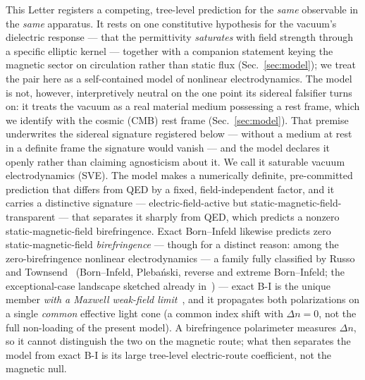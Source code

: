 \documentclass[aps,prd,twocolumn,superscriptaddress,nofootinbib,longbibliography]{revtex4-2}
\begin{document}
This Letter registers a competing, tree-level prediction for the \emph{same}
observable in the \emph{same} apparatus. It rests on one constitutive
hypothesis for the vacuum's dielectric response --- that the permittivity
\emph{saturates} with field strength through a specific elliptic kernel ---
together with a companion statement keying the magnetic sector on circulation
rather than static flux (Sec.~\ref{sec:model}); we treat the pair here as a
self-contained model of nonlinear electrodynamics. The model is not, however,
interpretively neutral on the one point its sidereal falsifier turns on: it
treats the vacuum as a real material medium possessing a rest frame, which we
identify with the cosmic (CMB) rest frame (Sec.~\ref{sec:model}). That premise
underwrites the sidereal signature registered below --- without a medium at rest
in a definite frame the signature would vanish --- and the model declares it
openly rather than claiming agnosticism about it. We call it saturable vacuum
electrodynamics (SVE). The model makes a numerically definite, pre-committed
prediction that differs from QED by a fixed, field-independent factor, and it
carries a distinctive signature --- electric-field-active but
static-magnetic-field-transparent --- that separates it sharply from QED, which
predicts a nonzero static-magnetic-field birefringence. Exact Born--Infeld
likewise predicts zero static-magnetic-field \emph{birefringence} --- though for a
distinct reason: among the zero-birefringence nonlinear electrodynamics --- a
family fully classified by Russo and
Townsend~\cite{RussoTownsend2023} (Born--Infeld, Plebański, reverse and extreme
Born--Infeld; the exceptional-case landscape sketched already
in~\cite{Plebanski1970}) --- exact B-I is the unique member \emph{with a Maxwell
weak-field limit}~\cite{BornInfeld1934,Boillat1970}, and it propagates both
polarizations on a single \emph{common} effective light cone (a common index shift
with $\Delta n=0$, not the full non-loading of the present model). A birefringence
polarimeter measures $\Delta n$, so it cannot distinguish the two on the magnetic
route; what then separates the model from exact B-I is its large tree-level
electric-route coefficient, not the magnetic null.
\end{document}
